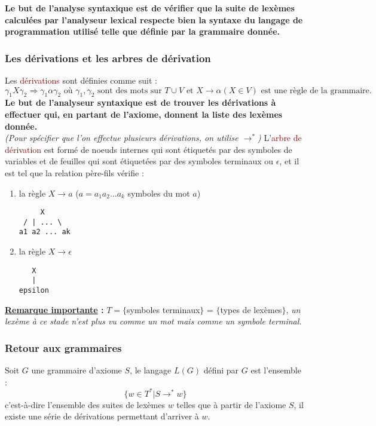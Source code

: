 \documentclass{article}
\newcommand{\red}[1]{\textcolor{darkred}{#1}}
\begin{document}
\noindent \textbf{Le but de l'analyse syntaxique est de vérifier que la suite de lexèmes calculées par l'analyseur lexical respecte bien la syntaxe du langage de programmation 
utilisé telle que définie par la grammaire donnée.}

\subsubsection{Les dérivations et les arbres de dérivation}

\noindent Les \red{dérivations} sont définies comme suit : 
\[
\gamma_1 X \gamma_2 \Rightarrow \gamma_1 \alpha \gamma_2 \text{ où } \gamma_1, \gamma_2 \text{ sont des mots sur } T\cup V \text{ et } X \rightarrow \alpha (X\in V) 
\text{ est une règle de la grammaire.}
\]
\textbf{Le but de l'analyseur syntaxique est de trouver les dérivations à effectuer qui, en partant de l'axiome, donnent la liste des lexèmes donnée.} \\
\textit{(Pour spécifier que l'on effectue plusieurs dérivations, on utilise $\rightarrow^*$)}
\newpage
\noindent L'\red{arbre de dérivation} est formé de noeuds internes qui sont étiquetés par des symboles de variables et de feuilles qui sont étiquetées par des symboles terminaux 
ou $\epsilon$, et il est tel que la relation père-fils vérifie :
\begin{enumerate}
\item la règle $X \rightarrow a$ ($a = a_1a_2 ... a_k$ symboles du mot $a$)
\begin{verbatim}
     X
 / | ... \
a1 a2 ... ak
\end{verbatim}
\item la règle $X \rightarrow \epsilon$
\begin{verbatim}
   X
   |
epsilon
\end{verbatim}
\end{enumerate}

\noindent \textbf{\underline{Remarque importante} : }$T=\{$symboles terminaux$\}$ = $\{$types de lexèmes$\}$, \textit{un lexème à ce stade n'est plus vu comme un mot 
mais comme un symbole terminal.}

\subsubsection{Retour aux grammaires}

Soit $G$ une grammaire d'axiome $S$, le langage $L(G)$ défini par $G$ est l'ensemble : 
\[\{w \in T^* | S \rightarrow^* w\}\]
c'est-à-dire l'ensemble des suites de lexèmes $w$ telles que à partir de l'axiome $S$, il existe une série de dérivations permettant d'arriver à $w$. \\
\end{document}
